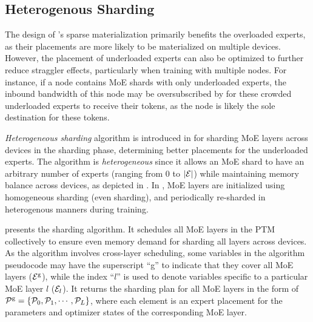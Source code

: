 

\subsection{Heterogenous Sharding}\label{sec:arch:o3}

The design of \xxx's sparse materialization primarily benefits the overloaded experts, as their placements are more likely to be materialized on multiple devices. However, the placement of underloaded experts can also be optimized to further reduce straggler effects, particularly when training with multiple nodes. 
For instance, if a node contains MoE shards with only underloaded experts, the inbound bandwidth of this node may be oversubscribed by \collatoa for these crowded underloaded experts to receive their tokens, as the node is likely the sole destination for these tokens.

\textit{Heterogeneous sharding} algorithm is introduced in \xxx for sharding MoE layers across devices in the sharding phase, determining better placements for the underloaded experts.
The algorithm is \textit{heterogeneous} since it allows an MoE shard to have an arbitrary number of experts (ranging from $0$ to $|\mathcal{E}|$) while maintaining memory balance across devices, as depicted in .
In \xxx, MoE layers are initialized using homogeneous sharding (\ie even sharding), and periodically re-sharded in heterogenous manners during training.



 presents the sharding algorithm. It schedules all MoE layers in the PTM collectively to ensure even memory demand for sharding all layers across devices. As the algorithm involves cross-layer scheduling, some variables in the algorithm pseudocode may have the superscript ``g'' to indicate that they cover all MoE layers (\eg $\mathcal{E}^\text{g}$), while the index ``$l$'' is used to denote variables specific to a particular MoE layer $l$ (\eg $\mathcal{E}_l$).
It returns the sharding plan for all MoE layers in the form of $\mathcal{P}^\text{g} = \{\mathcal{P}_0, \mathcal{P}_1, \cdots, \mathcal{P}_{L}\}$, where each element is an expert placement for the parameters and optimizer states of the corresponding MoE layer.

